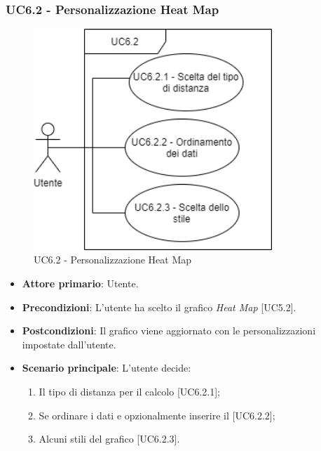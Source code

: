 \subsubsection{UC6.2 - Personalizzazione Heat Map}
\begin{figure}[h]
\includegraphics[width=9cm]{section/Images/UC6.2.png}
\centering
\caption{UC6.2 - Personalizzazione Heat Map}
\end{figure}
\begin{itemize}
	\item \textbf{Attore primario}: Utente.
	
	\item \textbf{Precondizioni}: L'utente ha scelto il grafico \textit{Heat Map} [UC5.2].
	
	\item \textbf{Postcondizioni}: Il grafico viene aggiornato con le personalizzazioni impostate dall'utente.
	
	\item \textbf{Scenario principale}: L'utente decide:
	
\begin{enumerate}
\item Il tipo di distanza per il calcolo [UC6.2.1];
\item Se ordinare i dati e opzionalmente inserire il  [UC6.2.2];
\item Alcuni stili del grafico [UC6.2.3].
\end{enumerate}	
		
\end{itemize}
